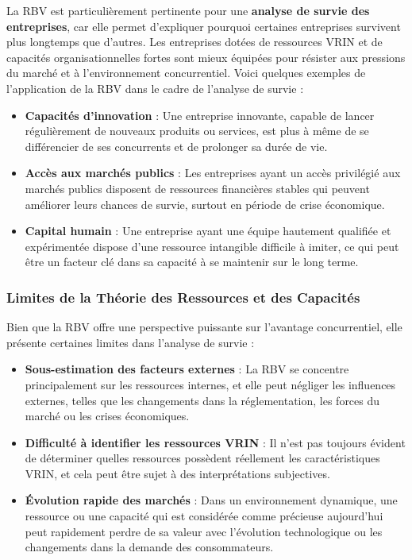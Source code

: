 \documentclass[a4paper,12pt]{report}
\begin{document}
La RBV est particulièrement pertinente pour une \textbf{analyse de survie des entreprises}, car elle permet d'expliquer pourquoi certaines entreprises survivent plus longtemps que d'autres. Les entreprises dotées de ressources VRIN et de capacités organisationnelles fortes sont mieux équipées pour résister aux pressions du marché et à l'environnement concurrentiel. Voici quelques exemples de l'application de la RBV dans le cadre de l'analyse de survie :
\begin{itemize}
    \item \textbf{Capacités d'innovation} : Une entreprise innovante, capable de lancer régulièrement de nouveaux produits ou services, est plus à même de se différencier de ses concurrents et de prolonger sa durée de vie.
    \item \textbf{Accès aux marchés publics} : Les entreprises ayant un accès privilégié aux marchés publics disposent de ressources financières stables qui peuvent améliorer leurs chances de survie, surtout en période de crise économique.
    \item \textbf{Capital humain} : Une entreprise ayant une équipe hautement qualifiée et expérimentée dispose d'une ressource intangible difficile à imiter, ce qui peut être un facteur clé dans sa capacité à se maintenir sur le long terme.
\end{itemize}

\subsubsection{Limites de la Théorie des Ressources et des Capacités}

Bien que la RBV offre une perspective puissante sur l'avantage concurrentiel, elle présente certaines limites dans l'analyse de survie :
\begin{itemize}
    \item \textbf{Sous-estimation des facteurs externes} : La RBV se concentre principalement sur les ressources internes, et elle peut négliger les influences externes, telles que les changements dans la réglementation, les forces du marché ou les crises économiques.
    \item \textbf{Difficulté à identifier les ressources VRIN} : Il n'est pas toujours évident de déterminer quelles ressources possèdent réellement les caractéristiques VRIN, et cela peut être sujet à des interprétations subjectives.
    \item \textbf{Évolution rapide des marchés} : Dans un environnement dynamique, une ressource ou une capacité qui est considérée comme précieuse aujourd'hui peut rapidement perdre de sa valeur avec l'évolution technologique ou les changements dans la demande des consommateurs.
\end{itemize}
\end{document}
